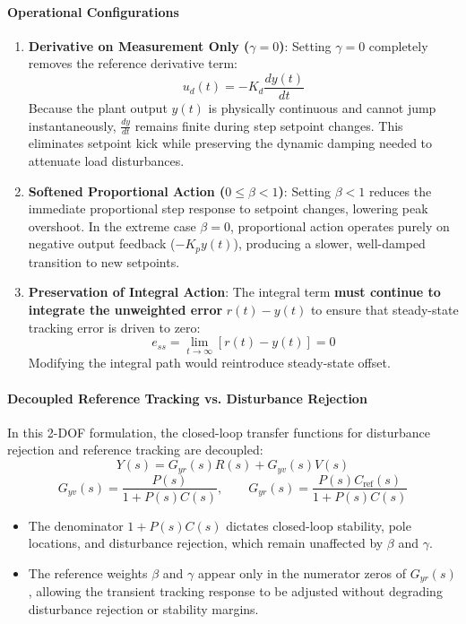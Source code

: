 \documentclass[12pt,onecolumn,twoside ]{article}
\begin{document}
	\paragraph{Operational Configurations}
	\begin{enumerate}
		\item
		\textbf{Derivative on Measurement Only ($\gamma = 0$)}: Setting $\gamma = 0$ completely removes the reference derivative term: \[
		u_d(t) = -K_d \frac{dy(t)}{dt}
		\] Because the plant output $y(t)$ is physically continuous and cannot jump instantaneously, $\frac{dy}{dt}$ remains finite during step setpoint changes. This eliminates setpoint kick while preserving the dynamic damping needed to attenuate load disturbances.
		\item
		\textbf{Softened Proportional Action ($0 \le \beta < 1$)}: Setting $\beta < 1$ reduces the immediate proportional step response to setpoint changes, lowering peak overshoot. In the extreme case $\beta = 0$, proportional action operates purely on negative output feedback ($-K_p y(t)$), producing a slower, well-damped transition to new setpoints.
		\item
		\textbf{Preservation of Integral Action}: The integral term \textbf{must continue to integrate the unweighted error} $r(t) - y(t)$ to ensure that steady-state tracking error is driven to zero: \[
		e_{ss} = \lim_{t \to \infty} [r(t) - y(t)] = 0
		\] Modifying the integral path would reintroduce steady-state offset.
	\end{enumerate}
	\paragraph{Decoupled Reference Tracking vs. Disturbance Rejection}
	In this 2-DOF formulation, the closed-loop transfer functions for disturbance rejection and reference tracking are decoupled: \[
	Y(s) = G_{yr}(s) R(s) + G_{yv}(s) V(s)
	\] \[
	G_{yv}(s) = \frac{P(s)}{1 + P(s)C(s)}, \qquad G_{yr}(s) = \frac{P(s) C_{\text{ref}}(s)}{1 + P(s)C(s)}
	\]
	\begin{itemize}
		\item
		The denominator $1 + P(s)C(s)$ dictates closed-loop stability, pole locations, and disturbance rejection, which remain unaffected by $\beta$ and $\gamma$.
		\item
		The reference weights $\beta$ and $\gamma$ appear only in the numerator zeros of $G_{yr}(s)$, allowing the transient tracking response to be adjusted without degrading disturbance rejection or stability margins.
	\end{itemize}
	
\end{document}
